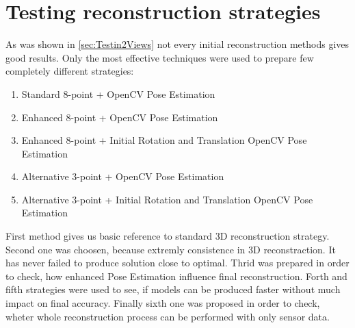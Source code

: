 \section{Testing reconstruction strategies}
As was shown in \ref{sec:Testin2Views} not every initial reconstruction methods gives good results. Only the most effective techniques were used to prepare few completely different strategies:
\begin{enumerate}
\item \textnormal{Standard 8-point + OpenCV Pose Estimation} 
\item \textnormal{Enhanced 8-point + OpenCV Pose Estimation} 
\item \textnormal{Enhanced 8-point + Initial Rotation and Translation OpenCV Pose Estimation} 
\item \textnormal{Alternative 3-point + OpenCV Pose Estimation}
\item \textnormal{Alternative 3-point + Initial Rotation and Translation OpenCV Pose Estimation}
\end{enumerate}
First method gives us basic reference to standard 3D reconstruction strategy. Second one was choosen, because extremly consistence in 3D reconstraction. It has never failed to produce solution close to optimal. Thrid was prepared in order to check, how enhanced Pose Estimation influence final reconstruction. Forth and fifth strategies were used to see, if models can be produced faster without much impact on final accuracy. Finally sixth one was proposed in order to check, wheter whole reconstruction process can be performed with only sensor data.

